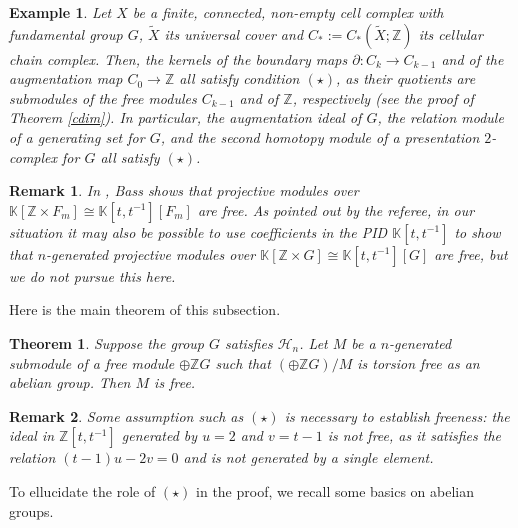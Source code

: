 \documentclass[11pt,letterpaper]{amsart}
\newtheorem{theorem}{Theorem}
\newtheorem*{example}{Example}
\newtheorem*{remark}{Remark}
\begin{document}
\begin{example}
Let $X$ be a finite, connected, non-empty cell complex with fundamental group $G$, $\widetilde{X}$ its universal cover and $C_{*} := C_{*} (\widetilde{X}; \mathbb{Z})$ its cellular chain complex. Then, the kernels of the boundary maps $\partial : C_k \rightarrow C_{k - 1}$ and of the augmentation map $C_0 \rightarrow \mathbb{Z}$ all satisfy condition $(\star)$, as their quotients are submodules of the free modules $C_{k - 1}$ and of $\mathbb{Z}$, respectively (see the proof of Theorem \ref{cdim}). In particular, the augmentation ideal of $G$, the relation module of a generating set for $G$, and the second homotopy module of a presentation $2$-complex for $G$ all satisfy $(\star)$. %
\end{example}
\begin{remark}
In \cite{bass}, Bass shows that projective modules over $\mathbb K[\mathbb Z\times F_m]\cong\mathbb K[t,t^{-1}][F_m]$ are free. As pointed out by the referee, in our situation it may also be possible to use coefficients in the PID $\mathbb K[t,t^{-1}]$ to show that $n$-generated projective modules over $\mathbb K[\mathbb Z\times G]\cong\mathbb K[t,t^{-1}][G]$ are free, but we do not pursue this here.  
\end{remark}
Here is the main theorem of this subsection. 
\begin{theorem}
\label{freezmodules}
Suppose the group $G$ satisfies $\mathcal{H}_{n}$. Let $M$ be a $n$-generated submodule of a free module $\oplus \mathbb{Z}G$ such that $(\oplus \mathbb{Z}G)/ M$ is torsion free as an abelian group. Then $M$ is free.
\end{theorem}

\begin{remark}
Some assumption such as $(\star)$ is necessary to establish freeness: the ideal in $\mathbb{Z} [t, t^{- 1}]$ generated by $u = 2$ and $v = t - 1$ is not free, as it satisfies the relation $(t - 1) u - 2 v = 0$ and is not generated by a single element. 
\end{remark}

To ellucidate the role of $(\star)$ in the proof, we recall some basics on abelian groups. 
\end{document}
